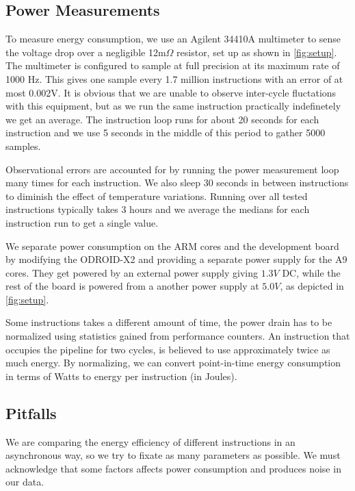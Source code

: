 \subsection{Power Measurements}
To measure energy consumption, we use an Agilent 34410A
multimeter\cite{agilent34410a} to sense the voltage drop over a negligible
12m$\Omega$ resistor, set up as shown in \autoref{fig:setup}. The multimeter is
configured to sample at full precision at its maximum rate of 1000 Hz. This
gives one sample every 1.7 million instructions with an error of at most 0.002V.
It is obvious that we are unable to observe inter-cycle fluctations with this
equipment, but as we run the same instruction practically indefinetely we get an
average. The instruction loop runs for about 20 seconds for each instruction and
we use 5 seconds in the middle of this period to gather 5000 samples.

Observational errors are accounted for by running the power measurement loop
many times for each instruction. We also sleep 30 seconds in between
instructions to diminish the effect of temperature variations. Running over all
tested instructions typically takes 3 hours and we average the medians for each
instruction run to get a single value.

We separate power consumption on the ARM cores and the development board by
modifying the ODROID-X2 and providing a separate power supply for the A9 cores.
They get powered by an external power supply giving $1.3V$ DC, while the rest of
the board is powered from a another power supply at $5.0V$, as depicted in
\autoref{fig:setup}.

Some instructions takes a different amount of time, the power drain has to
be normalized using statistics gained from performance counters. An instruction
that occupies the pipeline for two cycles, is believed to use approximately
twice as much energy. By normalizing, we can convert point-in-time energy
consumption in terms of Watts to energy per instruction (in Joules).


\subsection{Pitfalls}
We are comparing the energy efficiency of different instructions in an
asynchronous way, so we try to fixate as many parameters as possible. We must
acknowledge that some factors affects power consumption and produces noise in
our data.

